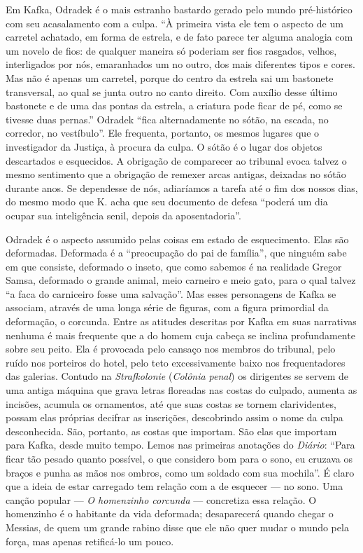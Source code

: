 Em Kafka, Odradek é o mais estranho bastardo gerado pelo mundo
pré-histórico com seu acasalamento com a culpa. ``À primeira vista ele
tem o aspecto de um carretel achatado, em forma de estrela, e de fato
parece ter alguma analogia com um novelo de fios: de qualquer maneira só
poderiam ser fios rasgados, velhos, interligados por nós, emaranhados um
no outro, dos mais diferentes tipos e cores. Mas não é apenas um
carretel, porque do centro da estrela sai um bastonete transversal, ao
qual se junta outro no canto direito. Com auxílio desse último bastonete
e de uma das pontas da estrela, a criatura pode ficar de pé, como se
tivesse duas pernas.'' Odradek ``fica alternadamente no sótão, na
escada, no corredor, no vestíbulo''. Ele frequenta, portanto, os mesmos
lugares que o investigador da Justiça, à procura da culpa. O sótão é o
lugar dos objetos descartados e esquecidos. A obrigação de comparecer ao
tribunal evoca talvez o mesmo sentimento que a obrigação de remexer
arcas antigas, deixadas no sótão durante anos. Se dependesse de nós,
adiaríamos a tarefa até o fim dos nossos dias, do mesmo modo que K. acha
que seu documento de defesa ``poderá um dia ocupar sua inteligência
senil, depois da aposentadoria''.

Odradek é o aspecto assumido pelas coisas em estado de esquecimento.
Elas são deformadas. Deformada é a ``preocupação do pai de família'',
que ninguém sabe em que consiste, deformado o inseto, que como sabemos é
na realidade Gregor Samsa, deformado o grande animal, meio carneiro e
meio gato, para o qual talvez ``a faca do carniceiro fosse uma
salvação''. Mas esses personagens de Kafka se associam, através de uma
longa série de figuras, com a figura primordial da deformação, o
corcunda. Entre as atitudes descritas por Kafka em suas narrativas
nenhuma é mais frequente que a do homem cuja cabeça se inclina
profundamente sobre seu peito. Ela é provocada pelo cansaço nos membros
do tribunal, pelo ruído nos porteiros do hotel, pelo teto excessivamente
baixo nos frequentadores das galerias. Contudo na \textit{Strafkolonie} (\textit{Colônia
penal}) os dirigentes se servem de uma antiga máquina que grava letras
floreadas nas costas do culpado, aumenta as incisões, acumula os
ornamentos, até que suas costas se tornem clarividentes, possam elas
próprias decifrar as inscrições, descobrindo assim o nome da culpa
desconhecida. São, portanto, as costas que importam. São elas que
importam para Kafka, desde muito tempo. Lemos nas primeiras anotações do
\textit{Diário}: ``Para ficar tão pesado quanto possível, o que considero bom
para o sono, eu cruzava os braços e punha as mãos nos ombros, como um
soldado com sua mochila''. É claro que a ideia de estar carregado tem
relação com a de esquecer --- no sono. Uma canção popular --- \textit{O
homenzinho corcunda} --- concretiza essa relação. O homenzinho é o
habitante da vida deformada; desaparecerá quando chegar o Messias, de
quem um grande rabino disse que ele não quer mudar o mundo pela força,
mas apenas retificá-lo um pouco.

